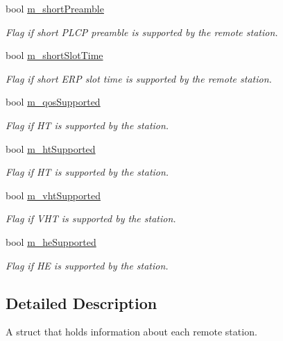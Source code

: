 \begin{DoxyCompactItemize}
bool \hyperlink{structns3_1_1WifiRemoteStationState_ab4f0872263d7462ad90dd5821f0d0c13}{m\+\_\+short\+Preamble}
\begin{DoxyCompactList}\small\item\em Flag if short P\+L\+CP preamble is supported by the remote station. \end{DoxyCompactList}\item 
bool \hyperlink{structns3_1_1WifiRemoteStationState_a1ca8cb2d693c1e38381b2a82e3081983}{m\+\_\+short\+Slot\+Time}
\begin{DoxyCompactList}\small\item\em Flag if short E\+RP slot time is supported by the remote station. \end{DoxyCompactList}\item 
bool \hyperlink{structns3_1_1WifiRemoteStationState_a856df44e25d231e55c2f50a6f213e6f3}{m\+\_\+qos\+Supported}
\begin{DoxyCompactList}\small\item\em Flag if HT is supported by the station. \end{DoxyCompactList}\item 
bool \hyperlink{structns3_1_1WifiRemoteStationState_a3ccb6120a00ab4615366750adee598a8}{m\+\_\+ht\+Supported}
\begin{DoxyCompactList}\small\item\em Flag if HT is supported by the station. \end{DoxyCompactList}\item 
bool \hyperlink{structns3_1_1WifiRemoteStationState_a65514f3a3b86b2a1acb98c464866e8fd}{m\+\_\+vht\+Supported}
\begin{DoxyCompactList}\small\item\em Flag if V\+HT is supported by the station. \end{DoxyCompactList}\item 
bool \hyperlink{structns3_1_1WifiRemoteStationState_a5b290a2914cbd4f98ac6582b966457c2}{m\+\_\+he\+Supported}
\begin{DoxyCompactList}\small\item\em Flag if HE is supported by the station. \end{DoxyCompactList}\end{DoxyCompactItemize}


\subsection{Detailed Description}
A struct that holds information about each remote station. 

